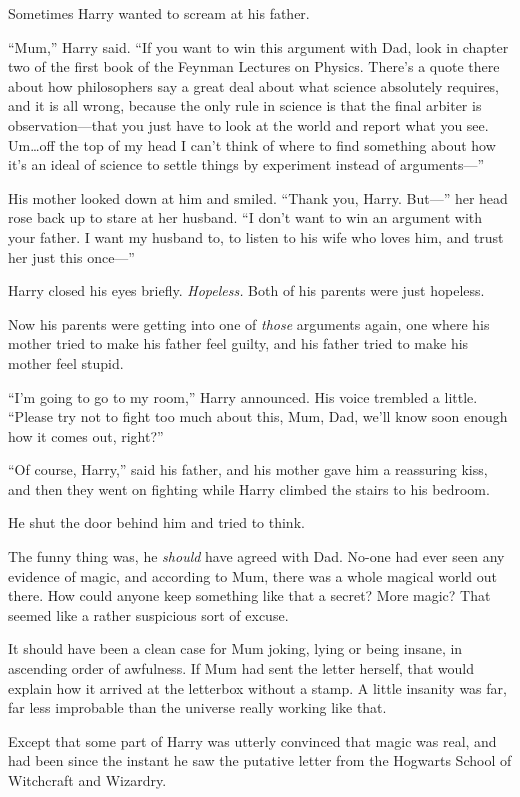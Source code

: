 Sometimes Harry wanted to scream at his father.

“Mum,” Harry said. “If you want to win this argument with Dad, look in chapter two of the first book of the Feynman Lectures on Physics. There’s a quote there about how philosophers say a great deal about what science absolutely requires, and it is all wrong, because the only rule in science is that the final arbiter is observation—that you just have to look at the world and report what you see. Um…off the top of my head I can’t think of where to find something about how it’s an ideal of science to settle things by experiment instead of arguments—”

His mother looked down at him and smiled. “Thank you, Harry. But—” her head rose back up to stare at her husband. “I don’t want to win an argument with your father. I want my husband to, to listen to his wife who loves him, and trust her just this once—”

Harry closed his eyes briefly. \emph{Hopeless.} Both of his parents were just hopeless.

Now his parents were getting into one of \emph{those} arguments again, one where his mother tried to make his father feel guilty, and his father tried to make his mother feel stupid.

“I’m going to go to my room,” Harry announced. His voice trembled a little. “Please try not to fight too much about this, Mum, Dad, we’ll know soon enough how it comes out, right?”

“Of course, Harry,” said his father, and his mother gave him a reassuring kiss, and then they went on fighting while Harry climbed the stairs to his bedroom.

He shut the door behind him and tried to think.

The funny thing was, he \emph{should} have agreed with Dad. No-one had ever seen any evidence of magic, and according to Mum, there was a whole magical world out there. How could anyone keep something like that a secret? More magic? That seemed like a rather suspicious sort of excuse.

It should have been a clean case for Mum joking, lying or being insane, in ascending order of awfulness. If Mum had sent the letter herself, that would explain how it arrived at the letterbox without a stamp. A little insanity was far, far less improbable than the universe really working like that.

Except that some part of Harry was utterly convinced that magic was real, and had been since the instant he saw the putative letter from the Hogwarts School of Witchcraft and Wizardry.

